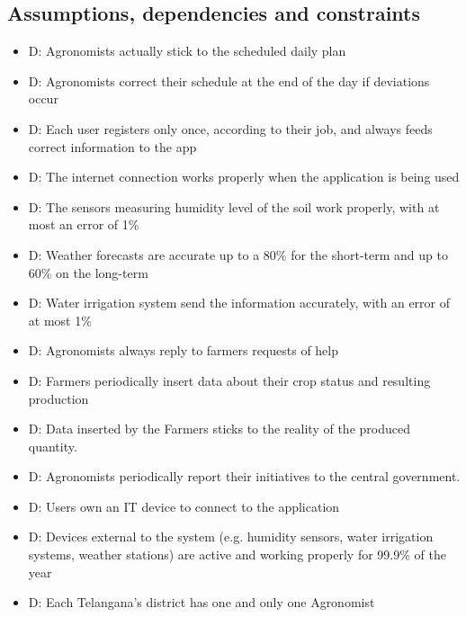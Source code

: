 \documentclass[table, 12pt]{article}
\begin{document}
\subsection{Assumptions, dependencies and constraints}
\begin{itemize}
    \item {}D: Agronomists actually stick to the scheduled daily plan
    \item {}D: Agronomists correct their schedule at the end of the day if deviations occur
    \item {}D: Each user registers only once, according to their job, and always feeds correct information to the app
    \item {}D: The internet connection works properly when the application is being used\footnotemark
    \item {}D: The sensors measuring humidity level of the soil work properly, with at most an error of 1\%
    \item {}D: Weather forecasts are accurate up to a 80\% for the short-term and up to 60\% on the long-term
    \item {}D: Water irrigation system send the information accurately, with an error of at most 1\%
    \item {}D: Agronomists always reply to farmers requests of help
    \item {}D: Farmers periodically insert data about their crop status and resulting production
    \item {}D: Data inserted by the Farmers sticks to the reality of the produced quantity.
    \item {}D: Agronomists periodically report their initiatives to the central government.
    \item {}D: Users own an IT device to connect to the application
    \item {}D: Devices external to the system (e.g. humidity sensors, water irrigation systems, weather stations) are active and working properly for 99.9\% of the year
    \item {}D: Each Telangana's district has one and only one Agronomist\footnotemark[\value{footnote}]
\end{itemize}
\newpage
\end{document}

